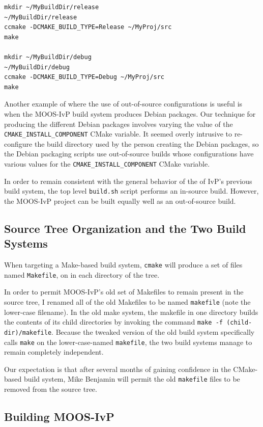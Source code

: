 \documentclass[letterpaper,10pt]{article}
\begin{document}
\begin{verbatim}
mkdir ~/MyBuildDir/release
~/MyBuildDir/release
ccmake -DCMAKE_BUILD_TYPE=Release ~/MyProj/src
make

mkdir ~/MyBuildDir/debug
~/MyBuildDir/debug
ccmake -DCMAKE_BUILD_TYPE=Debug ~/MyProj/src
make
\end{verbatim} 


Another example of where the use of out-of-source configurations is useful 
is when the MOOS-IvP build system produces Debian packages.  Our technique
for producing the different Debian packages involves varying the value of
the \verb|CMAKE_INSTALL_COMPONENT| CMake variable.  It seemed overly intrusive
to re-configure the build directory used by the person creating the Debian
packages, so the Debian packaging scripts use out-of-source builds whose
configurations have various values for the \verb|CMAKE_INSTALL_COMPONENT| 
CMake variable.

In order to remain consistent with the general behavior of the of IvP's
previous build system, the top level \verb|build.sh| script performs an
in-source build.  However, the MOOS-IvP project can be built equally well
as an out-of-source build.

\subsection{Source Tree Organization and the Two Build Systems}
When targeting a Make-based build system, \verb|cmake| will produce a set
of files named \verb|Makefile|, on in each directory of the tree.

In order to permit MOOS-IvP's old set of Makefiles to remain present in
the source tree, I renamed all of the old Makefiles to be named \verb|makefile|
(note the lower-case filename).  In the old make system, the makefile
in one directory builds the contents of its child directories by invoking
the command \verb|make -f (child-dir)/makefile|.  Because the tweaked version of the 
old build system specifically calls \verb|make| on the lower-case-named \verb|makefile|,
the two build systems manage to remain completely independent.

Our expectation is that after several months of gaining confidence in the CMake-based
build system, Mike Benjamin will permit the old \verb|makefile| files to be 
removed from the source tree.

\subsection{Building MOOS-IvP}
\end{document}
